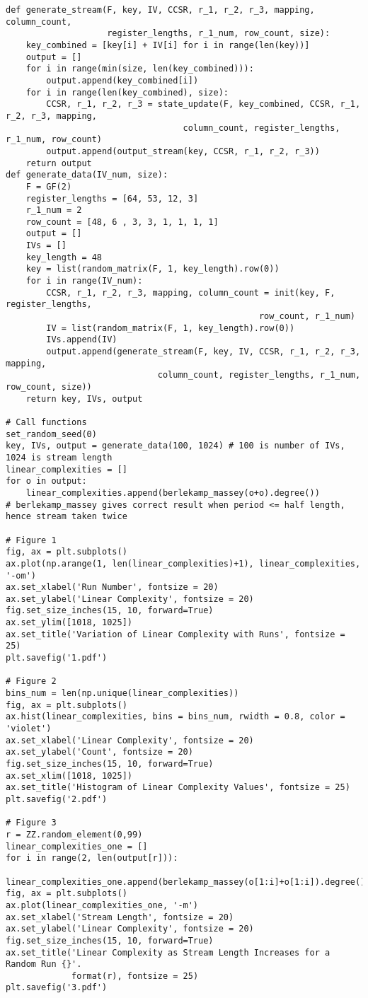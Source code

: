 \documentclass[a4paper,10pt]{article}
\begin{document}
\begin{verbatim}
def generate_stream(F, key, IV, CCSR, r_1, r_2, r_3, mapping, column_count, 
                    register_lengths, r_1_num, row_count, size):
    key_combined = [key[i] + IV[i] for i in range(len(key))]
    output = []
    for i in range(min(size, len(key_combined))):
        output.append(key_combined[i])
    for i in range(len(key_combined), size):
        CCSR, r_1, r_2, r_3 = state_update(F, key_combined, CCSR, r_1, r_2, r_3, mapping, 
                                   column_count, register_lengths, r_1_num, row_count)
        output.append(output_stream(key, CCSR, r_1, r_2, r_3))    
    return output
def generate_data(IV_num, size):
    F = GF(2)
    register_lengths = [64, 53, 12, 3]
    r_1_num = 2
    row_count = [48, 6 , 3, 3, 1, 1, 1, 1]
    output = []
    IVs = []
    key_length = 48
    key = list(random_matrix(F, 1, key_length).row(0))
    for i in range(IV_num):
        CCSR, r_1, r_2, r_3, mapping, column_count = init(key, F, register_lengths, 
                                                  row_count, r_1_num)
        IV = list(random_matrix(F, 1, key_length).row(0))
        IVs.append(IV)
        output.append(generate_stream(F, key, IV, CCSR, r_1, r_2, r_3, mapping, 
                              column_count, register_lengths, r_1_num, row_count, size))
    return key, IVs, output

# Call functions
set_random_seed(0)
key, IVs, output = generate_data(100, 1024) # 100 is number of IVs, 1024 is stream length
linear_complexities = []
for o in output:
    linear_complexities.append(berlekamp_massey(o+o).degree())
# berlekamp_massey gives correct result when period <= half length, hence stream taken twice

# Figure 1
fig, ax = plt.subplots()
ax.plot(np.arange(1, len(linear_complexities)+1), linear_complexities, '-om')
ax.set_xlabel('Run Number', fontsize = 20)
ax.set_ylabel('Linear Complexity', fontsize = 20)
fig.set_size_inches(15, 10, forward=True)
ax.set_ylim([1018, 1025])
ax.set_title('Variation of Linear Complexity with Runs', fontsize = 25)
plt.savefig('1.pdf')

# Figure 2
bins_num = len(np.unique(linear_complexities))
fig, ax = plt.subplots()
ax.hist(linear_complexities, bins = bins_num, rwidth = 0.8, color = 'violet')
ax.set_xlabel('Linear Complexity', fontsize = 20)
ax.set_ylabel('Count', fontsize = 20)
fig.set_size_inches(15, 10, forward=True)
ax.set_xlim([1018, 1025])
ax.set_title('Histogram of Linear Complexity Values', fontsize = 25)
plt.savefig('2.pdf')

# Figure 3
r = ZZ.random_element(0,99)
linear_complexities_one = []
for i in range(2, len(output[r])):
    linear_complexities_one.append(berlekamp_massey(o[1:i]+o[1:i]).degree())
fig, ax = plt.subplots()
ax.plot(linear_complexities_one, '-m')
ax.set_xlabel('Stream Length', fontsize = 20)
ax.set_ylabel('Linear Complexity', fontsize = 20)
fig.set_size_inches(15, 10, forward=True)
ax.set_title('Linear Complexity as Stream Length Increases for a Random Run {}'.
             format(r), fontsize = 25)
plt.savefig('3.pdf')
\end{verbatim}
\end{document}
